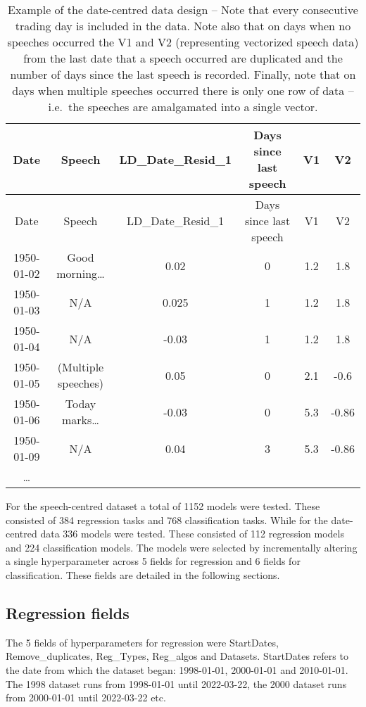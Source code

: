\documentclass[11pt,preprint, authoryear]{elsarticle}
\numberwithin{equation}{section}
\numberwithin{figure}{section}
\numberwithin{table}{section}
\begin{document}
\begin{longtable}[]{@{}cccccc@{}}
\caption{Example of the date-centred data design -- Note that every
consecutive trading day is included in the data. Note also that on days
when no speeches occurred the V1 and V2 (representing vectorized speech
data) from the last date that a speech occurred are duplicated and the
number of days since the last speech is recorded. Finally, note that on
days when multiple speeches occurred there is only one row of data --
i.e.~the speeches are amalgamated into a single vector.}\tabularnewline
\toprule
Date & Speech & LD\_Date\_Resid\_1 & Days since last speech & V1 & V2 \\
\midrule
\endfirsthead
\toprule
Date & Speech & LD\_Date\_Resid\_1 & Days since last speech & V1 & V2 \\
\midrule
\endhead
1950-01-02 & Good morning\ldots{} & 0.02 & 0 & 1.2 & 1.8 \\
1950-01-03 & N/A & 0.025 & 1 & 1.2 & 1.8 \\
1950-01-04 & N/A & -0.03 & 1 & 1.2 & 1.8 \\
1950-01-05 & (Multiple speeches) & 0.05 & 0 & 2.1 & -0.6 \\
1950-01-06 & Today marks\ldots{} & -0.03 & 0 & 5.3 & -0.86 \\
1950-01-09 & N/A & 0.04 & 3 & 5.3 & -0.86 \\
\ldots{} & & & & & \\
\bottomrule
\end{longtable}

For the speech-centred dataset a total of 1152 models were tested. These
consisted of 384 regression tasks and 768 classification tasks. While
for the date-centred data 336 models were tested. These consisted of 112
regression models and 224 classification models. The models were
selected by incrementally altering a single hyperparameter across 5
fields for regression and 6 fields for classification. These fields are
detailed in the following sections.

\hypertarget{regression-fields}{%
\subsection{Regression fields}\label{regression-fields}}

The 5 fields of hyperparameters for regression were StartDates,
Remove\_duplicates, Reg\_Types, Reg\_algos and Datasets. StartDates
refers to the date from which the dataset began: 1998-01-01, 2000-01-01
and 2010-01-01. The 1998 dataset runs from 1998-01-01 until 2022-03-22,
the 2000 dataset runs from 2000-01-01 until 2022-03-22 etc.
\end{document}
